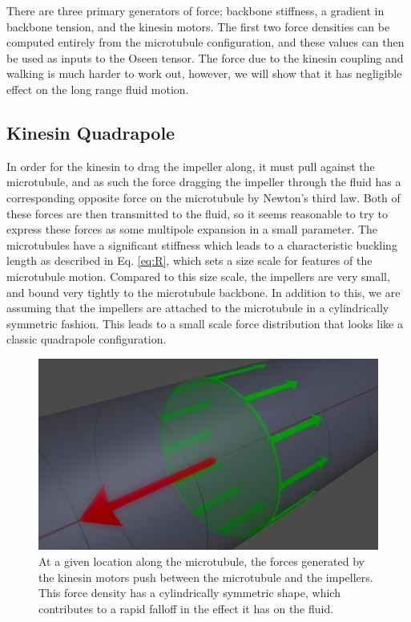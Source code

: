 \documentclass[11pt]{ucthesis}
\begin{document}
There are three primary generators of force; backbone stiffness, a gradient in backbone tension, and the kinesin motors. The first two force densities can be computed entirely from the microtubule configuration, and these values can then be used as inputs to the Oseen tensor.
The force due to the kinesin coupling and walking is much harder to work out, however, we will show that it has negligible effect on the long range fluid motion.

\subsection{Kinesin Quadrapole}
In order for the kinesin to drag the impeller along, it must pull against the microtubule, and as such the force dragging the impeller through the fluid has a corresponding opposite force on the microtubule by Newton's third law. 
Both of these forces are then transmitted to the fluid, so it seems reasonable to try to express these forces as some multipole expansion in a small parameter.
The microtubules have a significant stiffness which leads to a characteristic buckling length as described in Eq. \ref{eq:R}, which sets a size scale for features of the microtubule motion. Compared to this size scale, the impellers are very small, and bound very tightly to the microtubule backbone. 
In addition to this, we are assuming that the impellers are attached to the microtubule in a cylindrically symmetric fashion. This leads to a small scale force distribution that looks like a classic quadrapole configuration.

\begin{figure}[htp]
\begin{center}
\includegraphics[width=\hsize]{segforce.png}
\caption{ 
At a given location along the microtubule, the forces generated by the kinesin motors push between the microtubule and the impellers. This force density has a cylindrically symmetric shape, which contributes to a rapid falloff in the effect it has on the fluid.
}
\label{fig:quadforce}
\end{center}
\end{figure}
\end{document}
